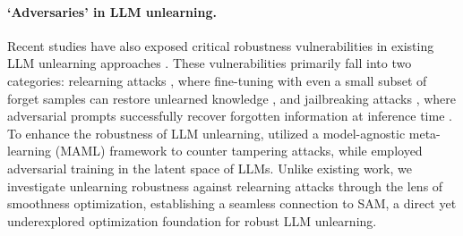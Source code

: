  




\paragraph{{`Adversaries' in LLM unlearning.}}
Recent studies have also exposed critical robustness vulnerabilities in existing LLM unlearning approaches \citep{lynch2024eight, lucki2024adversarial, hu2024jogging, zhang2024does, shumailov2024ununlearning, barez2025open, patil2023can,deeb2024unlearning,lo2024large}. These vulnerabilities primarily fall into two categories: relearning attacks \citep{hu2024jogging, lynch2024eight,deeb2024unlearning,lo2024large}, where fine-tuning with even a small subset of forget samples can restore unlearned knowledge \citep{lynch2024eight}, and jailbreaking attacks \citep{lucki2024adversarial, lynch2024eight, patil2023can}, where adversarial prompts successfully recover forgotten information at inference time \citep{lucki2024adversarial}. 
To enhance the robustness of LLM unlearning, 
\citep{tamirisa2024tamper} utilized a model-agnostic meta-learning (MAML) framework \citep{nichol2018first} to counter tampering attacks, while \citep{sheshadri2024latent} employed adversarial training in the latent space of LLMs. Unlike existing work, we investigate unlearning robustness against relearning attacks through the lens of smoothness optimization, establishing a seamless connection to SAM, a direct yet underexplored optimization foundation for robust LLM unlearning.

